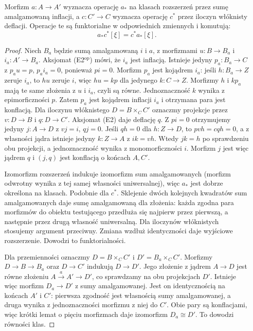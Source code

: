 \begin{stwierdzenie}\label{cat:prop:quillen-ext-base-change}
Morfizm $a:A\to A'$ wyznacza operację $a_*$ na klasach rozszerzeń przez sumę amalgamowaną inflacji, a $c:C'\to C$ wyznacza operację $c^*$ przez iloczyn włóknisty deflacji. Operacje te są funktorialne w odpowiednich zmiennych i komutują:
\[
 a_*c^*[\xi]=c^*a_*[\xi].
\]
\end{stwierdzenie}
\begin{proof}
Niech $B_a$ będzie sumą amalgamowaną $i$ i $a$, z morfizmami $u:B\to B_a$ i $i_a:A'\to B_a$. Aksjomat (E2$^{\mathrm{op}}$) mówi, że $i_a$ jest inflacją. Istnieje jedyny $p_a:B_a\to C$ z $p_au=p$, $p_ai_a=0$, ponieważ $pi=0$. Morfizm $p_a$ jest kojądrem $i_a$: jeśli $h:B_a\to Z$ zeruje $i_a$, to $hu$ zeruje $i$, więc $hu=kp$ dla jedynego $k:C\to Z$. Morfizmy $h$ i $kp_a$ mają te same złożenia z $u$ i $i_a$, czyli są równe. Jednoznaczność $k$ wynika z epimorficzności $p$. Zatem $p_a$ jest kojądrem inflacji $i_a$ i otrzymana para jest konflacją. Dla iloczynu włóknistego $D=B\times_C C'$ oznaczmy projekcje przez $v:D\to B$ i $q:D\to C'$. Aksjomat (E2) daje deflację $q$. Z $pi=0$ otrzymujemy jedyny $j:A\to D$ z $vj=i$, $qj=0$. Jeśli $qh=0$ dla $h:Z\to D$, to $pvh=cqh=0$, a z własności jądra istnieje jedyny $k:Z\to A$ z $ik=vh$. Wtedy $jk=h$ po sprawdzeniu obu projekcji, a jednoznaczność wynika z monomorficzności $i$. Morfizm $j$ jest więc jądrem $q$ i $(j,q)$ jest konflacją o końcach $A,C'$.

Izomorfizm rozszerzeń indukuje izomorfizm sum amalgamowanych (morfizm odwrotny wynika z tej samej własności uniwersalnej), więc $a_*$ jest dobrze określona na klasach. Podobnie dla $c^*$. Sklejenie dwóch kolejnych kwadratów sum amalgamowanych daje sumę amalgamowaną dla złożenia: każda zgodna para morfizmów do obiektu testującego przedłuża się najpierw przez pierwszą, a następnie przez drugą własność uniwersalną. Dla iloczynów włóknistych stosujemy argument przeciwny. Zmiana wzdłuż identyczności daje wyjściowe rozszerzenie. Dowodzi to funktorialności.

Dla przemienności oznaczmy $D=B\times_C C'$ i $D'=B_a\times_C C'$. Morfizmy $D\to B\to B_a$ oraz $D\to C'$ indukują $D\to D'$. Jego złożenie z jądrem $A\to D$ jest równe złożeniu $A\xrightarrow{a}A'\to D'$, co sprawdzamy na obu projekcjach $D'$. Istnieje więc morfizm $D_a\to D'$ z sumy amalgamowanej. Jest on identycznością na końcach $A'$ i $C'$: pierwsza zgodność jest własnością sumy amalgamowanej, a druga wynika z jednoznaczności morfizmu z niej do $C'$. Obie pary są konflacjami, więc krótki lemat o pięciu morfizmach daje izomorfizm $D_a\cong D'$. To dowodzi równości klas.
\end{proof}

